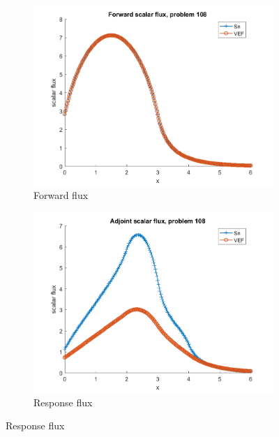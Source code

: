 \documentclass{article}
\begin{document}
\begin{figure}[H]
\label{Case108Flux}
\centering
\begin{subfigure}{.5\textwidth}
  \centering
  \includegraphics[width=.98\linewidth]{IanProposal/figures2/108phi.png}
  \caption{Forward flux}
  \label{fig:sfig1}
\end{subfigure}%
\begin{subfigure}{.5\textwidth}
  \centering
  \includegraphics[width=.98\linewidth]{IanProposal/figures2/108phia.png}
  \caption{Response flux}
  \label{fig:sfig4}
\end{subfigure}%
\end{figure}
\end{document}
